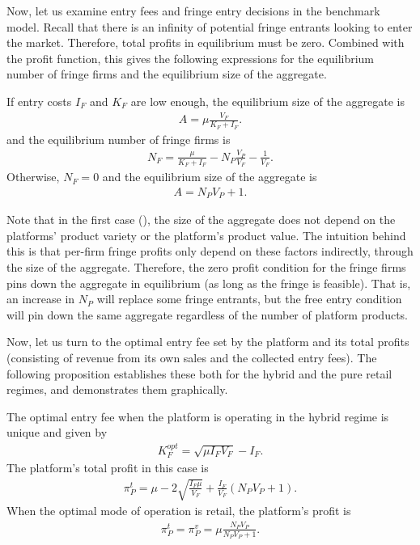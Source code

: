 Now, let us examine entry fees and fringe entry decisions in the benchmark model.
Recall that there is an infinity of potential fringe entrants looking to enter the market.
Therefore, total profits in equilibrium must be zero.
Combined with the profit function, this gives the following expressions for the equilibrium number of fringe firms and the equilibrium size of the aggregate.
\begin{proposition}
    \label{prop:equilibrium_aggregate_benchmark}
    If entry costs $I_F$ and $K_F$ are low enough, the equilibrium size of the aggregate is
    \begin{align}
        A = \mu \frac{V_F}{K_F + I_F}.
        \label{eq:aggregate_eq}
    \end{align}
    and the equilibrium number of fringe firms is
    \begin{align}
        N_F = \frac{\mu}{K_F + I_F} - N_P \frac{V_P}{V_F} - \frac{1}{V_F}.
        \label{eq:N_F_eq}
    \end{align}
    Otherwise,  $N_F = 0$ and the equilibrium size of the aggregate is
    \begin{align*}
        A = N_P V_P + 1.
    \end{align*}
\end{proposition}
Note that in the first case (), the size of the aggregate does not depend on the platforms' product variety or the platform's product value.
The intuition behind this is that per-firm fringe profits only depend on these factors indirectly, through the size of the aggregate.
Therefore, the zero profit condition for the fringe firms pins down the aggregate in equilibrium (as long as the fringe is feasible).
That is, an increase in $N_P$ will replace some fringe entrants, but the free entry condition will pin down the same aggregate regardless of the number of platform products.

Now, let us turn to the optimal entry fee set by the platform and its total profits (consisting of revenue from its own sales and the collected entry fees).
The following proposition establishes these both for the hybrid and the pure retail regimes, and  demonstrates them graphically.

\begin{theorem}
    \label{prop:optimal_entry_fee}
    The optimal entry fee when the platform is operating in the hybrid regime is unique and given by
    \begin{align}
        K_F^{opt} = \sqrt{\mu I_F V_F} - I_F. \label{eq:entry_fee_benchmark}
    \end{align}
    The platform's total profit in this case is
    \begin{align}
        \pi_P^{t} = \mu - 2\sqrt{\frac{I_F \mu}{V_F}} + \frac{I_F}{V_F} (N_P V_P + 1). \label{eq:platform_profits_hybrid_benchmark}
    \end{align}
    When the optimal mode of operation is retail, the platform's profit is
    \begin{align}
        \pi_P^{t} = \pi_P^{v} = \mu \frac{ N_P V_P}{N_P V_P + 1}. \label{eq:platform_profits_retail_benchmark}
    \end{align}
\end{theorem}

